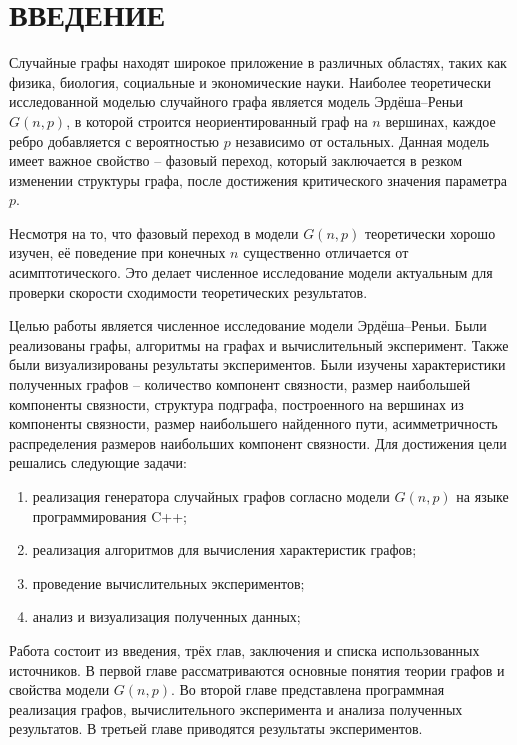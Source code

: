 \section*{ВВЕДЕНИЕ}
Случайные графы находят широкое приложение в различных областях,
таких как физика, биология, социальные и экономические науки. 
Наиболее теоретически исследованной моделью случайного графа является 
модель Эрдёша--Реньи $G(n,p)$, в которой строится 
неориентированный граф на $n$ вершинах, каждое ребро добавляется с
вероятностью  $p$ независимо от остальных. Данная модель имеет 
важное свойство -- фазовый переход, который заключается в резком изменении структуры графа, после достижения критического значения параметра $p$. 

Несмотря на то, что фазовый переход в модели $G(n,p)$ 
теоретически хорошо изучен, её поведение  
при конечных $n$ существенно отличается от асимптотического. Это делает численное исследование 
модели актуальным для проверки скорости сходимости теоретических
результатов.

Целью работы является численное исследование модели Эрдёша--Реньи. 
Были реализованы графы, алгоритмы на графах и вычислительный эксперимент. Также были визуализированы результаты экспериментов.
Были изучены характеристики полученных графов -- количество 
компонент связности, размер наибольшей компоненты связности, структура подграфа, построенного на вершинах из компоненты связности, размер наибольшего найденного пути, асимметричность распределения размеров наибольших компонент связности.
Для достижения цели решались следующие задачи:
\begin{enumerate}
    \item реализация генератора случайных графов 
        согласно модели $G(n,p)$ на языке программирования C++;
    \item реализация алгоритмов для вычисления характеристик графов;
    \item проведение вычислительных экспериментов;
    \item анализ и визуализация полученных данных;
\end{enumerate}

Работа состоит из введения, трёх глав, заключения и списка 
использованных источников. В первой главе рассматриваются 
основные понятия теории графов и свойства модели $G(n,p)$.
Во второй главе представлена программная реализация графов, 
вычислительного эксперимента и анализа полученных результатов.
В третьей главе приводятся результаты экспериментов.
